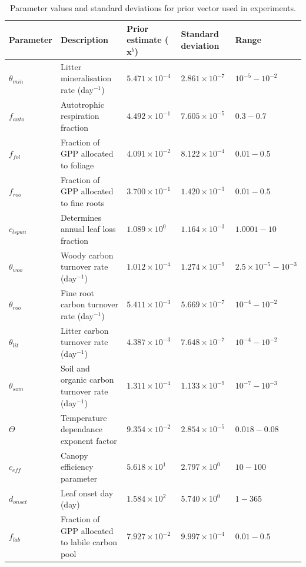 \documentclass[12pt]{article}
\begin{document}
\begin{table}[ht] 
	\caption{Parameter values and standard deviations for prior vector used in experiments.}
\begin{center}
\small
	\begin{tabular}{| l | p{} | p{2cm} | p{2cm} | p{2cm} |}
	\hline
	Parameter & Description & Prior estimate ($\textbf{x}^{b}$) & Standard deviation & Range \\ \hline
$\theta_{min}$ & Litter mineralisation rate (day$^{-1}$) & $5.471\times 10^{-4}$ & $2.861\times 10^{-7}$ & $10^{-5} - 10^{-2}$ \\ \hline
$f_{auto}$ & Autotrophic respiration fraction & $4.492\times 10^{-1}$ & $7.605\times 10^{-5}$ & $0.3 - 0.7$  \\ \hline
$f_{fol}$ & Fraction of GPP allocated to foliage & $4.091\times 10^{-2}$ & $8.122\times 10^{-4}$ & $0.01-0.5$ \\ \hline
$f_{roo}$ & Fraction of GPP allocated to fine roots & $3.700\times 10^{-1}$ & $1.420\times 10^{-3}$ & $0.01-0.5$ \\ \hline
$c_{lspan}$ & Determines annual leaf loss fraction & $1.089\times 10^{0} $ & $1.164\times 10^{-3}$ & $1.0001 - 10$ \\ \hline
$\theta_{woo}$ & Woody carbon turnover rate (day$^{-1}$) & $1.012\times 10^{-4}$ & $1.274\times 10^{-9}$ & $2.5\times10^{-5} - 10^{-3}$ \\ \hline
$\theta_{roo}$ & Fine root carbon turnover rate (day$^{-1}$) & $5.411\times 10^{-3}$ & $5.669\times 10^{-7}$ & $10^{-4} - 10^{-2}$ \\ \hline
$\theta_{lit}$ & Litter carbon turnover rate (day$^{-1}$) & $4.387\times 10^{-3}$ & $7.648\times 10^{-7}$ & $10^{-4} - 10^{-2}$ \\ \hline
$\theta_{som}$ & Soil and organic carbon turnover rate (day$^{-1}$) & $1.311\times 10^{-4}$ & $1.133\times 10^{-9}$ & $10^{-7} - 10^{-3}$ \\ \hline
$\Theta$ & Temperature dependance exponent factor & $9.354\times 10^{-2}$ & $2.854\times 10^{-5}$ & $0.018 - 0.08$ \\ \hline
$c_{eff}$ & Canopy efficiency parameter & $5.618\times 10^{1}$ & $2.797\times 10^{0}$ & $10 - 100$ \\ \hline
$d_{onset}$ & Leaf onset day (day) & $1.584\times 10^{2}$ & $5.740\times 10^{0}$ & $1 - 365$ \\ \hline
$f_{lab}$ & Fraction of GPP allocated to labile carbon pool & $7.927\times 10^{-2}$ & $9.997\times 10^{-4}$ & $0.01 - 0.5$ \\ \hline

\end{tabular}
\end{center}
\end{table}
\end{document}
